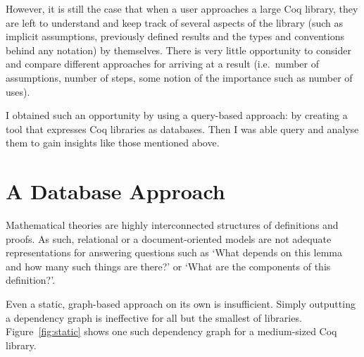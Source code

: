 However, it is still the case that when a user approaches a large Coq library, 
they are left to understand and keep track of several aspects of the
library (such as implicit assumptions, previously defined results and the
types and conventions behind any notation) by themselves. There is very little
opportunity to consider and compare different approaches for arriving at a
result (i.e.\ number of assumptions, number of steps, some notion of the
importance such as number of uses).

I obtained such an opportunity by using a query-based approach: by creating a
tool that expresses Coq libraries as databases. Then I was able query and
analyse them to gain insights like those mentioned above.

\section{A Database Approach}

Mathematical theories are highly interconnected structures of definitions and
proofs. As such, relational or a document-oriented models are not adequate
representations for answering questions such as `What depends on this lemma
and how many such things are there?' or `What are the components of this
definition?'.

Even a static, graph-based approach on its own is insufficient. Simply
outputting a dependency graph is ineffective for all but the smallest of
libraries. Figure~\ref{fig:static} shows one such dependency graph for a
medium-sized Coq library.

